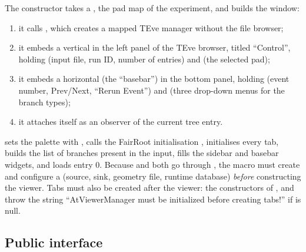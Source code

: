 The constructor takes a , the pad map of the experiment, and builds
the window:
\begin{enumerate}
  \item it calls , which creates a mapped TEve manager
        without the file browser;
  \item it embeds a vertical  in the left panel of the TEve browser, titled
        ``Control'', holding  (input file, run ID, number of entries) and
         (the selected pad);
  \item it embeds a horizontal  (the ``basebar'') in the bottom panel,
        holding  (event number, Prev/Next, ``Rerun Event'') and
         (three drop-down menus for the branch types);
  \item it attaches itself as an observer of the current tree entry.
\end{enumerate}

 sets the palette with , calls the
FairRoot initialisation , initialises every tab, builds the list of branches present
in the input, fills the sidebar and basebar widgets, and loads entry 0. Because
 and  both go through , the macro must
create and configure a  (source, sink, geometry file, runtime database)
\emph{before} constructing the viewer. Tabs must also be created after the viewer: the
constructors of ,  and  throw the string
``AtViewerManager must be initialized before creating tabs!'' if  is null.

\subsection{Public interface}

